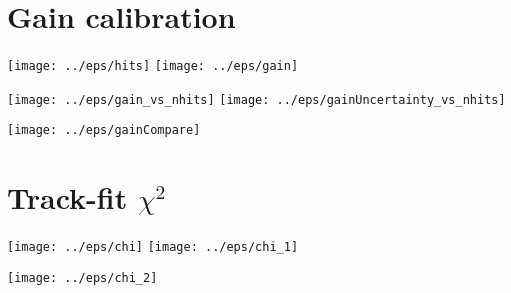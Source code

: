 \documentclass[a4paper]{article}
\begin{document}
\newpage

\section{Gain calibration}

\begin{center}
 \texttt{[image: ../eps/hits]}
 \texttt{[image: ../eps/gain]}
\end{center}

\begin{center}
 \texttt{[image: ../eps/gain\_vs\_nhits]}
 \texttt{[image: ../eps/gainUncertainty\_vs\_nhits]}
\end{center}

\begin{center}
 \texttt{[image: ../eps/gainCompare]}
\end{center}

\section{Track-fit $\chi^2$}

\begin{center}
 \texttt{[image: ../eps/chi]}
 \texttt{[image: ../eps/chi\_1]}

 \texttt{[image: ../eps/chi\_2]}
\end{center}
\end{document}
